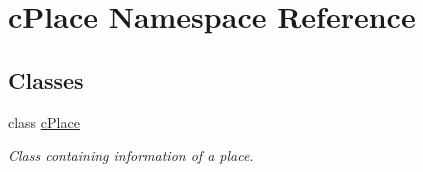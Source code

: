 \hypertarget{namespacecPlace}{\section{c\-Place \-Namespace \-Reference}
\label{namespacecPlace}
}
\subsection*{\-Classes}
\begin{DoxyCompactItemize}
\item 
class \hyperlink{classcPlace_1_1cPlace}{c\-Place}
\begin{DoxyCompactList}\small\item\em \-Class containing information of a place. \end{DoxyCompactList}\end{DoxyCompactItemize}
